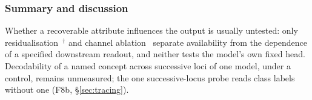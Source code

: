\subsubsection{Summary and discussion}

Whether a recoverable attribute influences the output is usually untested: only
residualisation~\cite{kim2026encoding}$^{\dagger}$ and channel ablation~\cite{nooralahzadeh2026sparse}
separate availability from the dependence of a specified downstream readout, and neither tests the model's
own fixed head. Decodability of a named concept across successive loci of one model, under a control, remains unmeasured;
the one successive-locus probe reads class labels without one (F8b, \S\ref{sec:tracing}).
